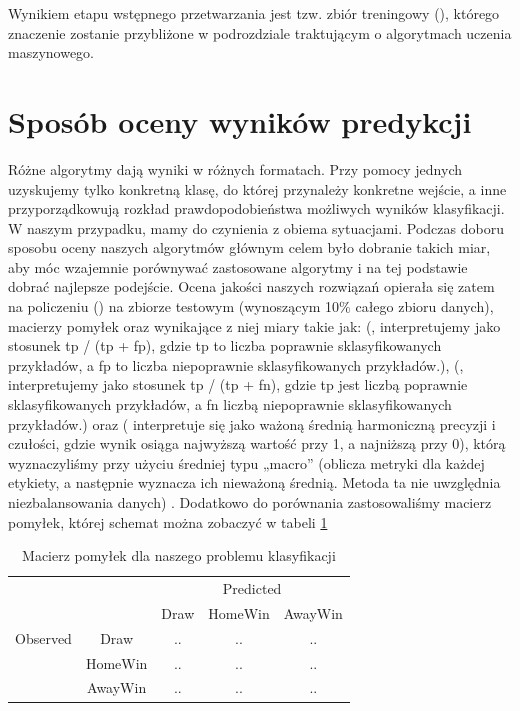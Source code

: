 Wynikiem etapu wstępnego przetwarzania jest tzw. zbiór treningowy (), którego znaczenie zostanie przybliżone w podrozdziale traktującym o algorytmach uczenia maszynowego.

\section{Sposób oceny wyników predykcji}
\label{section:ocenaWynikow}

Różne algorytmy dają wyniki w różnych formatach. Przy pomocy jednych uzyskujemy tylko konkretną klasę, do której przynależy konkretne wejście, a inne przyporządkowują rozkład prawdopodobieństwa możliwych wyników klasyfikacji. W naszym przypadku, mamy do czynienia z obiema sytuacjami. Podczas doboru sposobu oceny naszych algorytmów głównym celem było dobranie takich miar, aby móc wzajemnie porównywać zastosowane algorytmy i na tej podstawie dobrać najlepsze podejście. Ocena jakości naszych rozwiązań opierała się zatem na policzeniu  () na zbiorze testowym (wynoszącym 10\% całego zbioru danych), macierzy pomyłek oraz wynikające z niej miary takie jak:  (, interpretujemy jako stosunek tp / (tp + fp), gdzie tp to liczba poprawnie sklasyfikowanych przykładów, a fp to liczba niepoprawnie sklasyfikowanych przykładów.),  (, interpretujemy jako stosunek tp / (tp + fn), gdzie tp jest liczbą poprawnie sklasyfikowanych przykładów, a fn liczbą niepoprawnie sklasyfikowanych przykładów.) oraz  ( interpretuje się jako ważoną średnią harmoniczną precyzji i czułości, gdzie wynik  osiąga najwyższą wartość przy 1, a najniższą przy 0), którą wyznaczyliśmy przy użyciu średniej typu „macro” (oblicza metryki dla każdej etykiety, a następnie wyznacza ich nieważoną średnią. Metoda ta nie uwzględnia niezbalansowania danych) \cite{SKfscore}. Dodatkowo do porównania zastosowaliśmy macierz pomyłek, której schemat można zobaczyć w tabeli \ref{tab:macierz}

\begin{center}
\begin{table}
\renewcommand{\arraystretch}{1.5}
\caption{Macierz pomyłek dla naszego problemu klasyfikacji}
\label{tab:macierz}
\begin{center}
\begin{tabular}{|c|c|c|c|c|}
   \cline{3-5} 
   \multicolumn{1}{c}{} & & \multicolumn{3}{c|}{Predicted} \\ \cline{3-5}
   \multicolumn{1}{c}{} & & Draw & HomeWin & AwayWin \\ \hline
   
   {Observed}
   & Draw & .. & .. & ..  \\ \cline{2-5}
   & HomeWin & .. & .. & ..  \\ \cline{2-5}
   & AwayWin & .. & .. & .. \\ \hline
\end{tabular}
\end{center}
\end{table}
\end{center}

